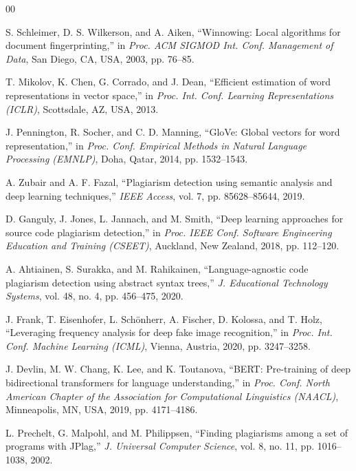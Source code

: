 \documentclass[10pt,twocolumn]{article}
\begin{document}
\begin{thebibliography}{00}

S. Schleimer, D. S. Wilkerson, and A. Aiken, ``Winnowing: Local algorithms for document fingerprinting,'' in \textit{Proc. ACM SIGMOD Int. Conf. Management of Data}, San Diego, CA, USA, 2003, pp. 76--85.

T. Mikolov, K. Chen, G. Corrado, and J. Dean, ``Efficient estimation of word representations in vector space,'' in \textit{Proc. Int. Conf. Learning Representations (ICLR)}, Scottsdale, AZ, USA, 2013.

J. Pennington, R. Socher, and C. D. Manning, ``GloVe: Global vectors for word representation,'' in \textit{Proc. Conf. Empirical Methods in Natural Language Processing (EMNLP)}, Doha, Qatar, 2014, pp. 1532--1543.

A. Zubair and A. F. Fazal, ``Plagiarism detection using semantic analysis and deep learning techniques,'' \textit{IEEE Access}, vol. 7, pp. 85628--85644, 2019.

D. Ganguly, J. Jones, L. Jannach, and M. Smith, ``Deep learning approaches for source code plagiarism detection,'' in \textit{Proc. IEEE Conf. Software Engineering Education and Training (CSEET)}, Auckland, New Zealand, 2018, pp. 112--120.

A. Ahtiainen, S. Surakka, and M. Rahikainen, ``Language-agnostic code plagiarism detection using abstract syntax trees,'' \textit{J. Educational Technology Systems}, vol. 48, no. 4, pp. 456--475, 2020.

J. Frank, T. Eisenhofer, L. Sch\"{o}nherr, A. Fischer, D. Kolossa, and T. Holz, ``Leveraging frequency analysis for deep fake image recognition,'' in \textit{Proc. Int. Conf. Machine Learning (ICML)}, Vienna, Austria, 2020, pp. 3247--3258.

J. Devlin, M. W. Chang, K. Lee, and K. Toutanova, ``BERT: Pre-training of deep bidirectional transformers for language understanding,'' in \textit{Proc. Conf. North American Chapter of the Association for Computational Linguistics (NAACL)}, Minneapolis, MN, USA, 2019, pp. 4171--4186.

L. Prechelt, G. Malpohl, and M. Philippsen, ``Finding plagiarisms among a set of programs with JPlag,'' \textit{J. Universal Computer Science}, vol. 8, no. 11, pp. 1016--1038, 2002.


\end{thebibliography}
\end{document}
